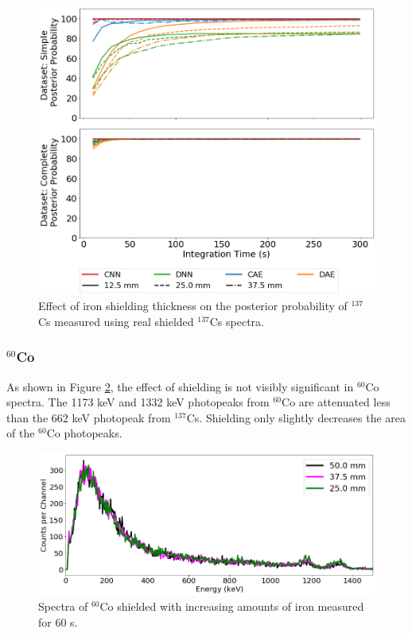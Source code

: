 \begin{figure}[H]
	\centering
	\includegraphics[width=0.8\linewidth]{images/iron_cs137}
	\caption{Effect of iron shielding thickness on the posterior probability of $^{137}$Cs measured using real shielded $^{137}$Cs spectra.}
	\label{fig:iron_cs137}
\end{figure}




\subsubsection{$^{60}$Co}

As shown in Figure \ref{fig:shielded_co60}, the effect of shielding is not visibly significant in $^{60}$Co spectra. The 1173 keV and 1332 keV photopeaks from $^{60}$Co are attenuated less than the 662 keV photopeak from $^{137}$Cs. Shielding only slightly decreases the area of the $^{60}$Co photopeaks.

\begin{figure}[H]
	\centering
	\includegraphics[width=0.8\linewidth]{images/shielded_co60}	
	\caption{Spectra of $^{60}$Co shielded with increasing amounts of iron measured for 60 s.}
	\label{fig:shielded_co60}
\end{figure}

